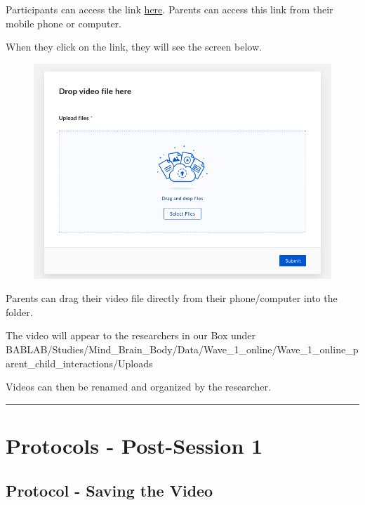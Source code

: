 \documentclass[]{book}
\begin{document}
Participants can access the link \href{https://ucla.app.box.com/f/3c52df2afb1a446ab363b793f8af22c1}{here}. Parents can access this link from their mobile phone or computer.

When they click on the link, they will see the screen below.

\begin{figure}
\centering
\includegraphics{images/zoom_parent_child_interaction/13.png}
\caption{}
\end{figure}

Parents can drag their video file directly from their phone/computer into the folder.

The video will appear to the researchers in our Box under BABLAB/Studies/Mind\_Brain\_Body/Data/Wave\_1\_online/Wave\_1\_online\_parent\_child\_interactions/Uploads

Videos can then be renamed and organized by the researcher.

\begin{center}\rule{0.5\linewidth}{0.5pt}\end{center}

\hypertarget{protocols---post-session-1}{%
\section{Protocols - Post-Session 1}\label{protocols---post-session-1}}

\hypertarget{protocol---saving-the-video}{%
\subsection{Protocol - Saving the Video}\label{protocol---saving-the-video}}
\end{document}
